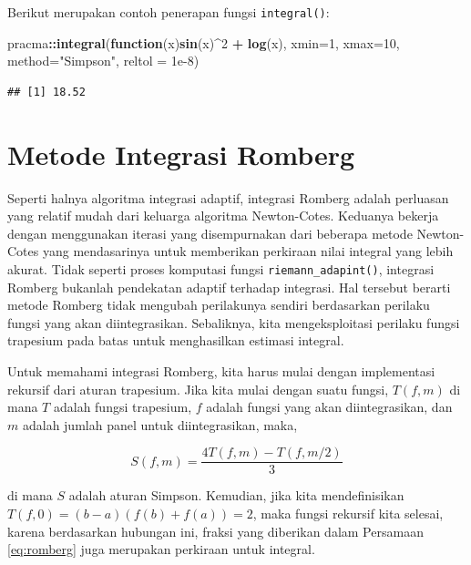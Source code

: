 \documentclass[
]{book}
\newenvironment{Shaded}{\begin{snugshade}}{\end{snugshade}}
\newcommand{\AttributeTok}[1]{\textcolor[rgb]{0.13,0.29,0.53}{#1}}
\newcommand{\ControlFlowTok}[1]{\textcolor[rgb]{0.13,0.29,0.53}{\textbf{#1}}}
\newcommand{\DecValTok}[1]{\textcolor[rgb]{0.00,0.00,0.81}{#1}}
\newcommand{\FloatTok}[1]{\textcolor[rgb]{0.00,0.00,0.81}{#1}}
\newcommand{\FunctionTok}[1]{\textcolor[rgb]{0.13,0.29,0.53}{\textbf{#1}}}
\newcommand{\NormalTok}[1]{#1}
\newcommand{\SpecialCharTok}[1]{\textcolor[rgb]{0.81,0.36,0.00}{\textbf{#1}}}
\newcommand{\StringTok}[1]{\textcolor[rgb]{0.31,0.60,0.02}{#1}}
\theoremstyle{definition}
\theoremstyle{definition}
\theoremstyle{definition}
\theoremstyle{definition}
\theoremstyle{remark}
\begin{document}
Berikut merupakan contoh penerapan fungsi \texttt{integral()}:

\begin{Shaded}
\begin{Highlighting}[]
\NormalTok{pracma}\SpecialCharTok{::}\FunctionTok{integral}\NormalTok{(}\ControlFlowTok{function}\NormalTok{(x)}\FunctionTok{sin}\NormalTok{(x)}\SpecialCharTok{\^{}}\DecValTok{2} \SpecialCharTok{+} \FunctionTok{log}\NormalTok{(x),}
          \AttributeTok{xmin=}\DecValTok{1}\NormalTok{, }\AttributeTok{xmax=}\DecValTok{10}\NormalTok{, }\AttributeTok{method=}\StringTok{"Simpson"}\NormalTok{,}
          \AttributeTok{reltol =} \FloatTok{1e{-}8}\NormalTok{)}
\end{Highlighting}
\end{Shaded}

\begin{verbatim}
## [1] 18.52
\end{verbatim}

\hypertarget{romberg}{%
\section{Metode Integrasi Romberg}\label{romberg}}

Seperti halnya algoritma integrasi adaptif, integrasi Romberg adalah perluasan yang relatif mudah dari keluarga algoritma Newton-Cotes. Keduanya bekerja dengan menggunakan iterasi yang disempurnakan dari beberapa metode Newton-Cotes yang mendasarinya untuk memberikan perkiraan nilai integral yang lebih akurat. Tidak seperti proses komputasi fungsi \texttt{riemann\_adapint()}, integrasi Romberg bukanlah pendekatan adaptif terhadap integrasi. Hal tersebut berarti metode Romberg tidak mengubah perilakunya sendiri berdasarkan perilaku fungsi yang akan diintegrasikan. Sebaliknya, kita mengeksploitasi perilaku fungsi trapesium pada batas untuk menghasilkan estimasi integral.

Untuk memahami integrasi Romberg, kita harus mulai dengan implementasi rekursif dari aturan trapesium. Jika kita mulai dengan suatu fungsi, \(T\left(f, m\right)\) di mana \(T\) adalah fungsi trapesium, \(f\) adalah fungsi yang akan diintegrasikan, dan \(m\) adalah jumlah panel untuk diintegrasikan, maka,

\begin{equation}
S\left(f, m\right)=\frac{4T\left(f, m\right)-T\left(f, m/2\right)}{3}
  \label{eq:romberg}
\end{equation}

di mana \(S\) adalah aturan Simpson. Kemudian, jika kita mendefinisikan \(T \left(f, 0\right) = \left(b − a\right) \left(f \left(b\right) + f \left(a\right)\right) = 2\), maka fungsi rekursif kita selesai, karena berdasarkan hubungan ini, fraksi yang diberikan dalam Persamaan \eqref{eq:romberg} juga merupakan perkiraan untuk integral.
\end{document}
